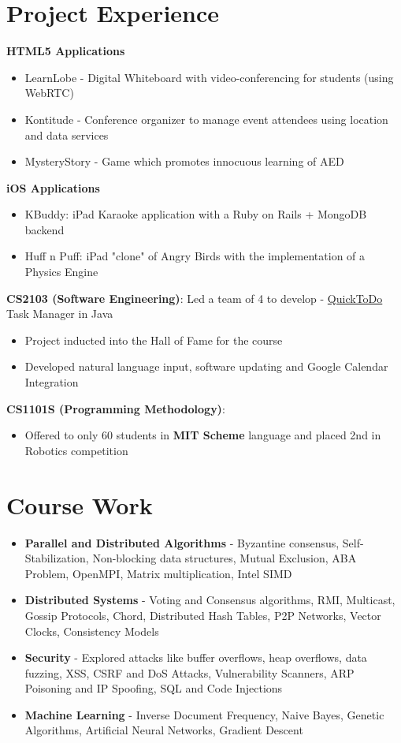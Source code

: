 \documentclass[11pt,a4paper]{moderncv}
\begin{document}
\section{Project Experience}
\textbf{HTML5 Applications}
\begin{itemize}
    \item LearnLobe - Digital Whiteboard with video-conferencing for students (using WebRTC)
    \item Kontitude - Conference organizer to manage event attendees using location and data services
    \item MysteryStory - Game which promotes innocuous learning of AED
\end{itemize}
\textbf{iOS Applications}
\begin{itemize}
     \item KBuddy: iPad Karaoke application with a Ruby on Rails + MongoDB backend
     \item Huff n Puff: iPad "clone" of Angry Birds with the implementation of a Physics Engine
\end{itemize}
\textbf{CS2103 (Software Engineering)}: Led a team of 4 to develop - \href{http://github.com/vellvisher/quicktodo}{QuickToDo} Task Manager in Java
 \begin{itemize}
 \item Project inducted into the
   Hall of Fame for the course
     \item Developed natural language input, software updating and Google Calendar Integration
 \end{itemize}
 \textbf{CS1101S (Programming Methodology)}:
 \begin{itemize}
    \item Offered to only 60 students in \textbf{MIT Scheme} language and placed 2nd in Robotics competition
 \end{itemize}
\section{Course Work}
{\begin{itemize}
 \item \textbf{Parallel and Distributed Algorithms} - Byzantine consensus, Self-Stabilization, Non-blocking data structures,
    Mutual Exclusion, ABA Problem, OpenMPI, Matrix multiplication, Intel SIMD
 \item \textbf{Distributed Systems} - Voting and Consensus algorithms, RMI, Multicast, Gossip Protocols, Chord, Distributed Hash Tables, P2P Networks, Vector Clocks, Consistency Models
 \item \textbf{Security} - Explored attacks like buffer overflows,
     heap overflows, data fuzzing, XSS, CSRF and DoS Attacks, Vulnerability Scanners,
     ARP Poisoning and IP Spoofing, SQL and Code Injections
 \item \textbf{Machine Learning} - Inverse Document Frequency, Naive Bayes, Genetic Algorithms, Artificial Neural Networks, Gradient Descent
 \end{itemize}}
\end{document}
